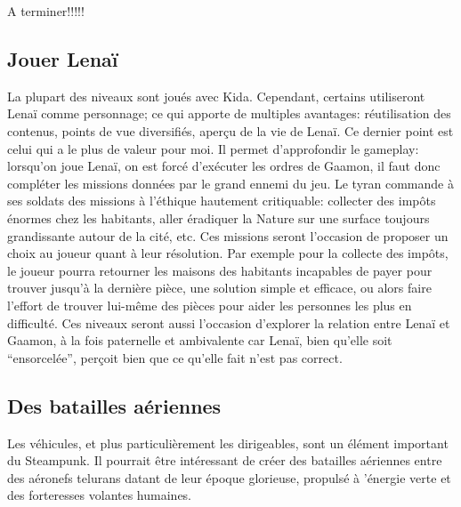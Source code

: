 {\color{red} A terminer!!!!!} 

\subsection{Jouer Lenaï}
La plupart des niveaux sont joués avec Kida. Cependant, certains utiliseront Lenaï comme personnage; ce qui apporte de multiples avantages: réutilisation des contenus, points de vue diversifiés, aperçu de la vie de Lenaï. Ce dernier point est celui qui a le plus de valeur pour moi. Il permet d'approfondir le gameplay: lorsqu'on joue Lenaï, on est forcé d'exécuter les ordres de Gaamon, il faut donc compléter les missions données par le grand ennemi du jeu. Le tyran commande à ses soldats des missions à l'éthique hautement critiquable: collecter des impôts énormes chez les habitants, aller éradiquer la Nature sur une surface toujours grandissante autour de la cité, etc. Ces missions seront l'occasion de proposer un choix au joueur quant à leur résolution. Par exemple pour la collecte des impôts, le joueur pourra retourner les maisons des habitants incapables de payer pour trouver jusqu'à la dernière pièce, une solution simple et efficace, ou alors faire l'effort de  trouver lui-même des pièces pour aider les personnes les plus en difficulté. Ces niveaux seront aussi l'occasion d'explorer la relation entre Lenaï et Gaamon, à la fois paternelle et ambivalente car Lenaï, bien qu'elle soit \enquote{ensorcelée}, perçoit bien que ce qu'elle fait n'est pas correct.

\subsection{Des batailles aériennes}
Les véhicules, et plus particulièrement les dirigeables, sont un élément important du Steampunk. Il pourrait être intéressant de créer des batailles aériennes entre des aéronefs telurans datant de leur époque glorieuse, propulsé à 'énergie verte et des forteresses volantes humaines.



